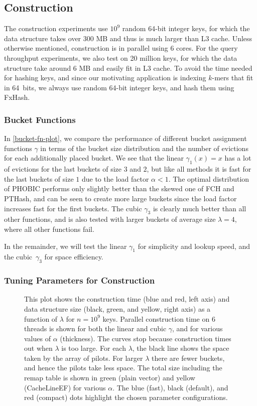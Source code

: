 \documentclass[a4paper,UKenglish,cleveref,thm-restate]{lipics-v2021}
\begin{document}
\subsection{Construction}
\label{construction-eval}
The construction experiments use \(10^9\) random 64-bit integer keys,
for which the data structure takes
over 300 MB and thus is much larger than L3 cache. Unless otherwise mentioned,
construction is in parallel using 6 cores.
For the query throughput experiments, we also test on
20 million keys, for which the data structure take around
6 MB and easily fit in L3 cache.
To avoid the time needed for hashing keys, and since our motivating application
is indexing $k$-mers that fit in 64~bits, we always use random 64-bit integer keys, and hash them using FxHash.
\subsubsection{Bucket Functions}
\label{sec:org222e6a1}

In \cref{bucket-fn-plot}, we compare the performance of different bucket assignment
functions \(\gamma\) in terms of the bucket size distribution and the number of
evictions for each additionally placed bucket.
We see that the linear \(\gamma_1(x) = x\) has a lot of evictions for the last
buckets of size \(3\) and \(2\), but like all methods it is fast for the last
buckets of size \(1\) due to the load factor \(\alpha < 1\). The optimal
distribution of PHOBIC performs only slightly better than the skewed one of FCH and
PTHash, and can be seen to create more large buckets since the load factor
increases fast for the first buckets.
The cubic \(\gamma_3\) is clearly much better than all other functions, and is
also tested with larger buckets of average size \(\lambda = 4\), where all other
functions fail.

In the remainder, we will test the linear \(\gamma_1\) for simplicity and lookup
speed, and the cubic~\(\gamma_3\) for space efficiency.
\subsubsection{Tuning Parameters for Construction}
\label{sec:org24c954f}

\begin{figure}[t]
\centering

\caption{\label{fig:construction}This plot shows the construction time (blue and red, left axis) and data structure size (black, green, and yellow, right axis) as a function of \(\lambda\) for \(n=10^9\) keys. Parallel construction time on 6 threads is shown for both the linear and cubic \(\gamma\), and for various values of \(\alpha\) (thickness). The curves stop because construction times out when \(\lambda\) is too large. For each \(\lambda\), the black line shows the space taken by the array of pilots. For larger \(\lambda\) there are fewer buckets, and hence the pilots take less space. The total size including the remap table is shown in green (plain vector) and yellow (CacheLineEF) for various \(\alpha\). The blue (fast), black (default), and red (compact) dots highlight the chosen parameter configurations.}
\end{figure}
\end{document}
